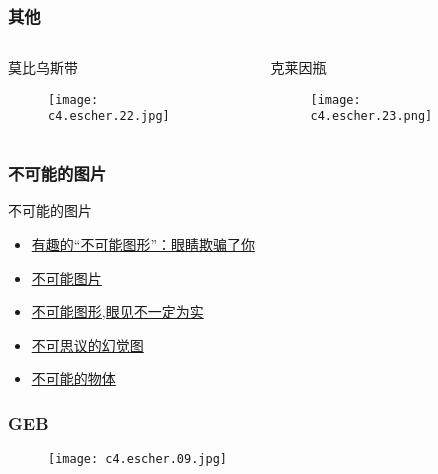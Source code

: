 \begin{frame}
  \frametitle{其他}
  \begin{columns}
    \begin{block}{莫比乌斯带}
      \begin{figure}
        \centering
        \texttt{[image: c4.escher.22.jpg]}
      \end{figure}
    \end{block}
    \begin{block}{克莱因瓶}
      \begin{figure}
        \centering
        \texttt{[image: c4.escher.23.png]}
      \end{figure}
    \end{block}
  \end{columns}
\end{frame}

\begin{frame}
  \frametitle{不可能的图片}
  \begin{block}{不可能的图片}
    \begin{itemize}
      \item \href{http://news.xinhuanet.com/tech/2009-03/25/content_11072865.htm}{有趣的“不可能图形”：眼睛欺骗了你}
      \item \href{http://www.360doc.com/content/14/0626/17/699582_390050495.shtml}{不可能图片}
      \item \href{http://www.yi2.net/article/201606/13115.html}{不可能图形,眼见不一定为实}
      \item \href{http://yaoyao33.lofter.com/post/bcfa4_70ac2d3}{不可思议的幻觉图}
      \item \href{https://cn.depositphotos.com/vector-images/\%E4\%B8\%8D\%E5\%8F\%AF\%E8\%83\%BD\%E7\%9A\%84\%E7\%89\%A9\%E4\%BD\%93.html}{不可能的物体}
    \end{itemize}
  \end{block}
\end{frame}

\begin{frame}
  \frametitle{GEB}
  \begin{figure}
    \centering
    \texttt{[image: c4.escher.09.jpg]}
  \end{figure}
\end{frame}

